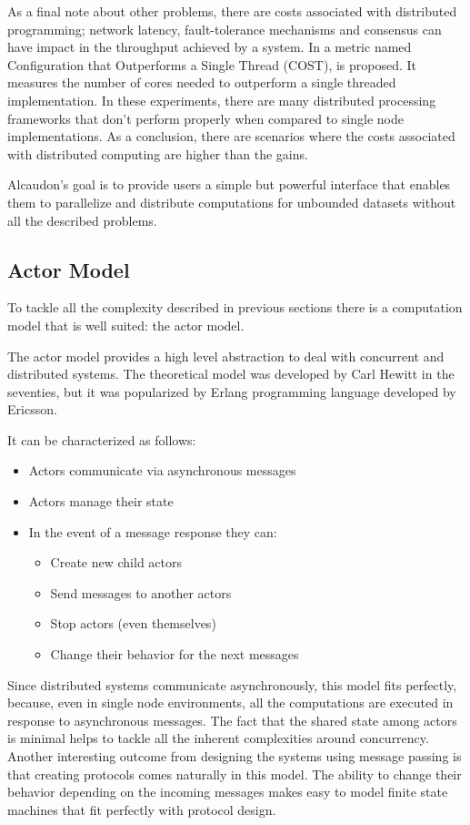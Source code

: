 As a final note about other problems, there are costs associated with
distributed programming; network latency, fault-tolerance mechanisms and
consensus can have impact in the throughput achieved by a system. In
\cite{189908} a metric named Configuration that Outperforms a Single Thread
(COST), is proposed. It measures the number of cores needed to outperform a
single threaded implementation. In these experiments, there are many distributed
processing frameworks that don't perform properly when compared to single node
implementations. As a conclusion, there are scenarios where the costs associated
with distributed computing are higher than the gains.

Alcaudon's goal is to provide users a simple but powerful interface that enables
them to parallelize and distribute computations for unbounded datasets without all
the described problems.

\subsection{Actor Model}

To tackle all the complexity described in previous sections there is a
computation model that is well suited: the actor model.

The actor model provides a high level abstraction to deal with concurrent and
distributed systems. The theoretical model was developed by Carl Hewitt in
the seventies, but it was popularized by Erlang programming language\cite{erlang}
developed by Ericsson.

It can be characterized as follows:
\begin{itemize}
\item Actors communicate via asynchronous messages
\item Actors manage their state
\item In the event of a message response they can:
  \begin{itemize}
  \item Create new child actors
  \item Send messages to another actors
  \item Stop actors (even themselves)
  \item Change their behavior for the next messages
  \end{itemize}
\end{itemize}

Since distributed systems communicate asynchronously, this model fits perfectly,
because, even in single node environments, all the computations are executed in
response to asynchronous messages. The fact that the shared state among actors
is minimal helps to tackle all the inherent complexities around concurrency.
Another interesting outcome from designing the systems using message passing is
that creating protocols comes naturally in this model. The ability to change
their behavior depending on the incoming messages makes easy to model finite
state machines that fit perfectly with protocol design.

